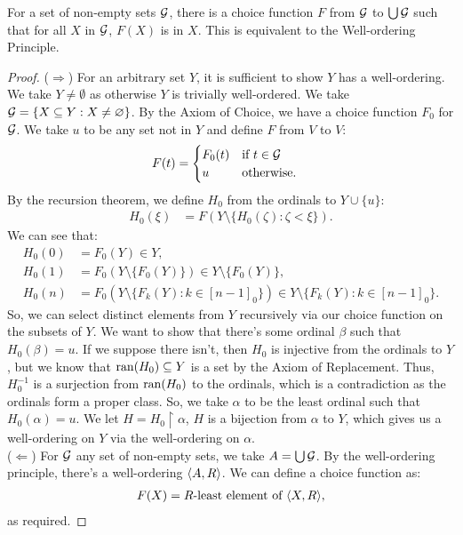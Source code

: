 For a set of non-empty sets $\mathcal{G}$, there is a choice function
$F$ from $\mathcal{G}$ to $\bigcup \mathcal{G}$ such that for all $X$ in $\mathcal{G}$,
$F(X)$ is in $X$. This is equivalent to the Well-ordering Principle.

\begin{proof}
    ($\Longrightarrow$) For an arbitrary set $Y$, it is sufficient to
    show $Y$ has a well-ordering. 
    We take $Y \neq \emptyset$ as otherwise $Y$
    is trivially well-ordered. We take 
    $\mathcal{G} = \{X \subseteq Y : X \neq \varnothing\}$. By the Axiom
    of Choice, we have a choice function $F_0$ for $\mathcal{G}$.
    We take $u$ to be any set not in $Y$ and
    define $F$ from $V$ to $V$: \begin{align*}
        F(t) &= \begin{cases}
            F_0(t) & \text{if } t \in \mathcal{G} \\
            u      & \text{otherwise}.
        \end{cases}
    \end{align*} By the recursion theorem, we define $H_0$ from
    the ordinals to $Y \cup \{u\}$: \begin{align*}
        H_0(\xi) &= F(Y \setminus \{H_0(\zeta) : \zeta < \xi\}).
    \end{align*} We can see that: \begin{align*}
        H_0(0) &= F_0(Y) \in Y, \\
        H_0(1) &= F_0(Y \setminus \{F_0(Y)\}) \in Y \setminus \{F_0(Y)\}, \\
        H_0(n) &= F_0(Y \setminus \{F_k(Y) : k \in [n - 1]_0\})
            \in Y \setminus \{F_k(Y) : k \in [n - 1]_0\}.
    \end{align*} So, we can select distinct elements from $Y$
    recursively via our choice function on the subsets of $Y$.
    We want to show that there's some ordinal $\beta$ such that
    $H_0(\beta) = u$. If we suppose there isn't, then $H_0$
    is injective from the ordinals to $Y$, but we know
    that $\operatorname{ran}(H_0) \subseteq Y$ is a set by the Axiom of Replacement. 
    Thus, $H_0^{-1}$ is a surjection from $\operatorname{ran}(H_0)$ to the ordinals, which is a 
    contradiction as the ordinals form a proper class. So,
    we take $\alpha$ to be the least ordinal such that $H_0(\alpha) = u$.
    We let $H = H_0 \upharpoonright \alpha$, $H$ is a bijection
    from $\alpha$ to $Y$, which gives us a well-ordering on $Y$ via the
    well-ordering on $\alpha$.
    \\[\baselineskip]
    ($\Longleftarrow$) For $\mathcal{G}$ any set of non-empty sets, we take
    $A = \bigcup \mathcal{G}$. By the well-ordering principle, there's a
    well-ordering ${\langle A, R \rangle}$. We can define a choice function as: \begin{align*}
        F(X) = R\text{-least element of } {\langle X, R \rangle},
    \end{align*} as required.
\end{proof}

